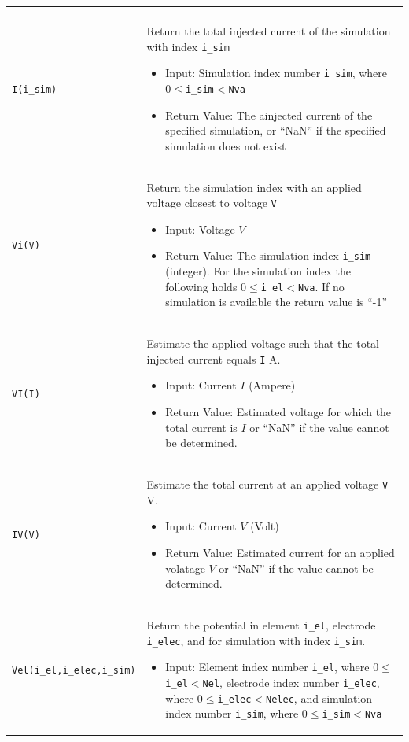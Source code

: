 \documentclass[noshowpacs,preprintnumbers,amsmath,amssymb, letter]{revtex4}
\begin{document}
\begin{longtable}{p{}p{}}
\begin{itemize}
\end{itemize} \\
\texttt{I(i\_sim)}	& Return the total injected current of the simulation with index \texttt{i\_sim}
\begin{itemize}
\item Input: Simulation index number \texttt{i\_sim}, where $0 \le $\texttt{i\_sim}$ < $\texttt{Nva}
\item Return Value: The ainjected current of the specified simulation, or ``NaN'' if the specified simulation does not exist
\end{itemize} \\
\texttt{Vi(V)}		& Return the simulation index with an applied voltage closest to voltage \texttt{V}
\begin{itemize}
\item Input: Voltage $V$
\item Return Value: The simulation index \texttt{i\_sim} (integer). For the simulation index the following holds $0 \le $\texttt{i\_el}$ < $\texttt{Nva}. If no simulation is available the return value is ``-1''
\end{itemize}\\ 
\texttt{VI(I)}		& Estimate the applied voltage such that the total injected current equals \texttt{I} A.
\begin{itemize}
\item Input: Current $I$ (Ampere)
\item Return Value: Estimated voltage for which the total current is $I$ or ``NaN'' if the value cannot be determined.
\end{itemize} \\
\texttt{IV(V)}		& Estimate the total current at an applied voltage \texttt{V} V. 
\begin{itemize}
\item Input: Current $V$ (Volt)
\item Return Value: Estimated current for an applied volatage $V$ or ``NaN'' if the value cannot be determined.
\end{itemize} \\
\texttt{Vel(i\_el,i\_elec,i\_sim)}	& Return the potential in element \texttt{i\_el}, electrode \texttt{i\_elec}, and for simulation with index \texttt{i\_sim}.
\begin{itemize}
\item Input: Element index number \texttt{i\_el}, where $0 \le $\texttt{i\_el}$ < $\texttt{Nel}, electrode index number \texttt{i\_elec}, where $0 \le $\texttt{i\_elec}$ < $\texttt{Nelec}, and simulation index number \texttt{i\_sim}, where $0 \le $\texttt{i\_sim}$ < $\texttt{Nva}

\end{itemize}
\end{longtable}
\end{document}
